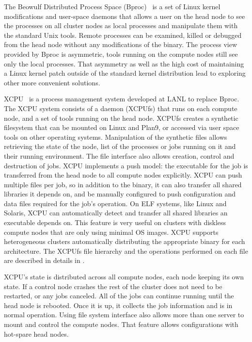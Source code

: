 \documentclass[10pt,conference,letterpaper]{IEEEtran}
\begin{document}
The Beowulf Distributed Process Space (Bproc)~\cite{bproc} is a set of
Linux kernel modifications and user-space daemons that allows a user on the head
node to see the processes on all cluster nodes as local processes and
manipulate them with the standard Unix tools. Remote processes can be
examined, killed or debugged from the head node without any modifications of
the binary. The process view provided by Bproc is asymmetric, tools running
on the compute nodes still see only the local processes. That asymmetry as
well as the high cost of maintaining a Linux kernel patch outside of the
standard kernel distribution lead to exploring other more convenient solutions.

XCPU~\cite{ron-xcpu} is a process management system developed at LANL to
replace Bproc. The XCPU system consists of a daemon (XCPUfs) that runs on
each compute node, and a set of tools running on the head node. XCPUfs
creates a synthetic filesystem that can be mounted on Linux and Plan9, or
accessed via user space tools on other operating systems. 
Manipulation of the synthetic files allows
retrieving the state of the node, list of the processes or jobs running on
it and their running environment. The file interface also allows creation,
control and destruction of jobs. XCPU implements a push model: the
executable for the job is transferred from the head node to all compute
nodes explicitly. XCPU can push multiple files per job, so in addition to
the binary, it can also transfer all shared libraries it depends on,
and be manually configured to push configuration and data files 
required for the job's operation. On ELF
systems, like Linux and Solaris, XCPU can automatically detect and transfer
all shared libraries an executable depends on. This feature is very useful
on clusters with diskless compute nodes that are only using minimal OS
images. XCPU supports heterogeneous clusters automatically distributing the
appropriate binary for each architecture. The XCPUfs file hierarchy and
the operations performed on each file are described in details in
\cite{lucho-xcpu}.

XCPU's state is distributed across all compute nodes, each node keeping its
own state. If a control node crashes the rest of the cluster does not need to
be restarted, or any jobs canceled. All of the jobs can continue running
until the head node is rebooted. Once it is up, it collects the job
information and is in normal operation. Using file system interface also
allows more than one server to mount and control the compute nodes. That
feature allows configurations with hot-spare head nodes.
\end{document}
